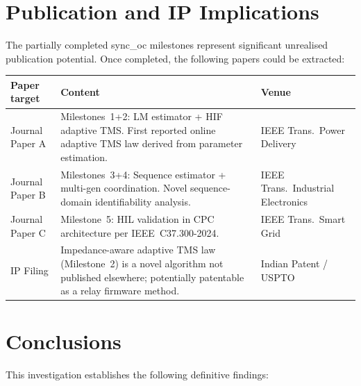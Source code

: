\documentclass[12pt,a4paper]{article}
\begin{document}
\section{Publication and IP Implications}
\label{sec:publication}

The partially completed sync\_oc milestones represent significant unrealised
publication potential.  Once completed, the following papers could be extracted:

\begin{center}
\begin{tabular}{p{2.5cm}p{5.5cm}p{4cm}}
\toprule
\textbf{Paper target} & \textbf{Content} & \textbf{Venue} \\
\midrule
Journal Paper A & Milestones~1+2: LM estimator + HIF adaptive TMS. First
                  reported online adaptive TMS law derived from parameter
                  estimation. & IEEE Trans.\ Power Delivery \\
\midrule
Journal Paper B & Milestones~3+4: Sequence estimator + multi-gen coordination.
                  Novel sequence-domain identifiability analysis. & IEEE Trans.\ Industrial Electronics \\
\midrule
Journal Paper C & Milestone~5: HIL validation in CPC architecture per
                  IEEE~C37.300-2024. & IEEE Trans.\ Smart Grid \\
\midrule
IP Filing & Impedance-aware adaptive TMS law (Milestone~2) is a novel
            algorithm not published elsewhere; potentially patentable as
            a relay firmware method. & Indian Patent / USPTO \\
\bottomrule
\end{tabular}
\end{center}


\section{Conclusions}
\label{sec:conclusions}

This investigation establishes the following definitive findings:
\end{document}
